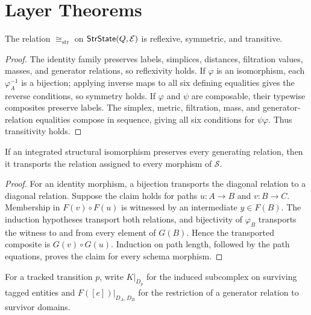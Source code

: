 \section{Layer Theorems}

\begin{proposition}
The relation $\cong_{\mathrm{str}}$ on $\mathsf{StrState}(Q,\mathcal E)$ is reflexive,
symmetric, and transitive.
\end{proposition}

\begin{proof}
The identity family preserves labels, simplices, distances, filtration values,
masses, and generator relations, so reflexivity holds. If $\varphi$ is an
isomorphism, each $\varphi_A^{-1}$ is a bijection; applying inverse maps to all
six defining equalities gives the reverse conditions, so symmetry holds. If
$\varphi$ and $\psi$ are composable, their typewise composites preserve labels.
The simplex, metric, filtration, mass, and generator-relation equalities compose
in sequence, giving all six conditions for $\psi\varphi$. Thus transitivity
holds.
\end{proof}

\begin{proposition}
If an integrated structural isomorphism preserves every generating relation,
then it transports the relation assigned to every morphism of $\mathcal S$.
\end{proposition}

\begin{proof}
For an identity morphism, a bijection transports the diagonal relation to a
diagonal relation. Suppose the claim holds for paths $u:A\to B$ and $v:B\to C$.
Membership in $F(v)\circ F(u)$ is witnessed by an intermediate $y\in F(B)$.
The induction hypotheses transport both relations, and bijectivity of
$\varphi_B$ transports the witness to and from every element of $G(B)$. Hence
the transported composite is $G(v)\circ G(u)$. Induction on path length,
followed by the path equations, proves the claim for every schema morphism.
\end{proof}

For a tracked transition $p$, write $K|_{D_p}$ for the induced subcomplex on
surviving tagged entities and $F([e])|_{D_A,D_B}$ for the restriction of a
generator relation to survivor domains.

